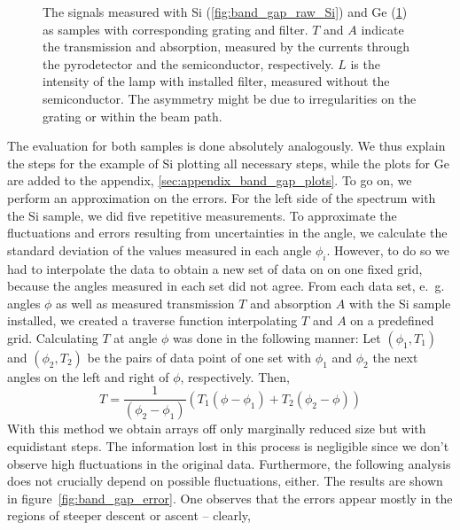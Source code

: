 \begin{figure}
\begin{subfigure}[b]{\pltw}
        \caption{}
        \label{fig:band_gap_raw_Ge}
    \end{subfigure}
    \caption{
        The signals measured with Si (\ref{fig:band_gap_raw_Si}) 
        and Ge (\ref{fig:band_gap_raw_Ge}) as samples with corresponding 
        grating and filter. $T$ and $A$ indicate 
        the transmission and absorption, measured by the currents through 
        the pyrodetector and the semiconductor, respectively. 
        $L$ is the intensity of the lamp with installed filter, measured 
        without the semiconductor. The asymmetry might be due to 
        irregularities on the grating or within the beam path. 
        }
    \label{fig:band_gap}
\end{figure}
The evaluation for both samples is done 
absolutely analogously. We thus explain the steps for the example 
of Si plotting all necessary steps, while the plots for 
Ge are added to the appendix, \ref{sec:appendix_band_gap_plots}.
To go on, we perform an approximation on the errors. For the 
left side of the spectrum with the Si sample, we 
did five repetitive measurements. To approximate the fluctuations 
and errors resulting from uncertainties in the angle, 
we calculate the standard deviation of the values measured 
in each angle $\phi_i$. However, to do so we had to 
interpolate the data to obtain a new set of data on 
on one fixed grid, because the angles measured in each set did not agree. 
From each data set, e.~g. angles $\phi$ as well as measured transmission $T$ 
and absorption $A$ with the Si sample installed, we created a traverse function 
interpolating $T$ and $A$ on a predefined grid. 
Calculating $T$ at angle $\phi$ was done in the following manner:
Let $(\phi_1, T_1)$ and 
$(\phi_2, T_2)$ be the pairs of data point of one set with $\phi_1$ and $\phi_2$ the 
next angles on the left and right of $\phi$, respectively. 
Then, 
\begin{equation}
    T = \frac{1}{(\phi_2 - \phi_1)} 
        \left(T_1\left(\phi - \phi_1\right) + T_2\left(\phi_2 - \phi\right)\right)
\end{equation}
With this method we obtain arrays off only marginally reduced size but with 
equidistant steps. The information lost in this process is negligible since we 
don't observe high fluctuations in the original data. Furthermore, the following 
analysis does not crucially depend on possible fluctuations, either. 
The results are shown in figure~\ref{fig:band_gap_error}. One observes that the 
errors appear mostly in the regions of steeper descent or ascent -- clearly, 
